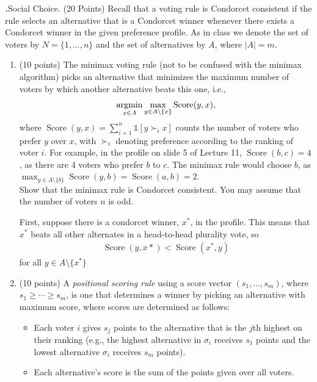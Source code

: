 \documentclass[12pt]{amsart}
\newenvironment{statement}[1]{\smallskip\noindent\color[rgb]{0.0,0.0,0.0} {\bf #1.}}{}
\newcommand{\1}{\mathds{1}}
\newcommand{\Score}{\operatorname{Score}}
\begin{document}
\begin{statement}{2} \textit{Social Choice.} (20 Points) 
Recall that a voting rule is Condorcet consistent if the rule selects an alternative that is a Condorcet winner whenever there exists a Condorcet winner in the given preference profile. As in class we denote the set of voters by $N=\{1,\ldots,n\}$ and the set of alternatives by $A$, where $|A|=m$.

\begin{enumerate}
    \item (10 points) The minimax voting rule (not to be confused with the minimax algorithm) picks an alternative that minimizes the maximum number of voters by which another alternative beats this one, i.e., 
    \[ \operatornamewithlimits{argmin}_{x\in A}\max_{y\in A\setminus\{x\}} \operatorname{Score}(y, x),\]
    where $\operatorname{Score}(y, x) = \sum_{i=1}^n \1[y\succ_i x]$ counts the number of voters who prefer $y$ over $x$, with $\succ_i$ denoting preference according to the ranking of voter $i$. For example, in the profile on slide 5 of Lecture 11, $\operatorname{Score}(b,c)=4$, as there are 4 voters who prefer $b$ to $c$. The minimax rule would choose $b$, as $\max_{y\in A\setminus\{b\}} \operatorname{Score}(y, b)=\operatorname{Score}(a,b)=2$.\\ 
    Show that the minimax rule is Condorcet consistent. You may assume that the number of voters $n$ is odd.
    \begin{tcolorbox}
        First, suppose there is a condorcet winner, $x^*$, in the profile. This means that $x^*$ beats all other alternates in a head-to-head 
        plurality vote, so 
        \begin{align*}
            \Score(y, x*) < \Score(x^*, y)
        \end{align*}
        for all $y\in A\setminus\{ x^* \}$
    \end{tcolorbox}
    \item (10 points) A \textit{positional scoring rule} using a score vector $(s_1, \ldots, s_m)$, where $s_1 \geq \cdots \geq s_m$, is one that determines a winner by picking an alternative with maximum score, where scores are determined as follows:
    \begin{itemize}
        \item Each voter $i$ gives $s_j$ points to the alternative that is the $j$th highest on their ranking (e.g., the highest alternative in $\sigma_i$ receives $s_1$ points and the lowest alternative $\sigma_i$ receives $s_m$ points).
        \item Each alternative's score is the sum of the points given over all voters.

\end{itemize}
\end{enumerate}
\end{statement}
\end{document}
